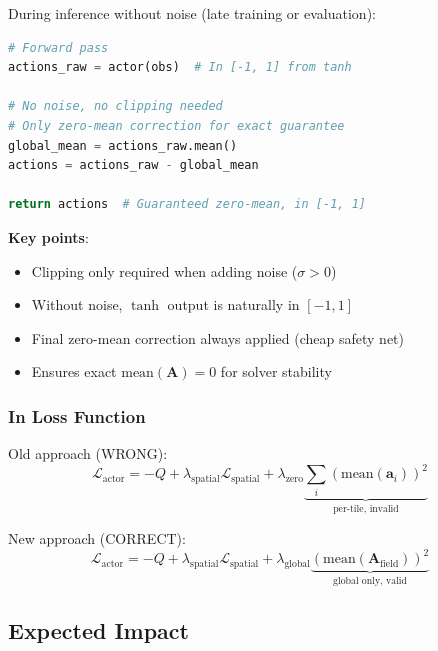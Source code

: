 \documentclass[11pt,a4paper]{article}
\theoremstyle{definition}
\begin{document}
During inference without noise (late training or evaluation):
\begin{lstlisting}[language=Python]
# Forward pass
actions_raw = actor(obs)  # In [-1, 1] from tanh

# No noise, no clipping needed
# Only zero-mean correction for exact guarantee
global_mean = actions_raw.mean()
actions = actions_raw - global_mean

return actions  # Guaranteed zero-mean, in [-1, 1]
\end{lstlisting}

\textbf{Key points}:
\begin{itemize}
    \item Clipping only required when adding noise ($\sigma > 0$)
    \item Without noise, $\tanh$ output is naturally in $[-1, 1]$
    \item Final zero-mean correction always applied (cheap safety net)
    \item Ensures exact $\text{mean}(\mathbf{A}) = 0$ for solver stability
\end{itemize}

\subsubsection{In Loss Function}

Old approach (WRONG):
\begin{equation}
\mathcal{L}_{\text{actor}} = -Q + \lambda_{\text{spatial}} \mathcal{L}_{\text{spatial}} + \lambda_{\text{zero}} \underbrace{\sum_i (\text{mean}(\mathbf{a}_i))^2}_{\text{per-tile, invalid}}
\end{equation}

New approach (CORRECT):
\begin{equation}
\mathcal{L}_{\text{actor}} = -Q + \lambda_{\text{spatial}} \mathcal{L}_{\text{spatial}} + \lambda_{\text{global}} \underbrace{(\text{mean}(\mathbf{A}_{\text{field}}))^2}_{\text{global only, valid}}
\end{equation}

\subsection{Expected Impact}
\end{document}
